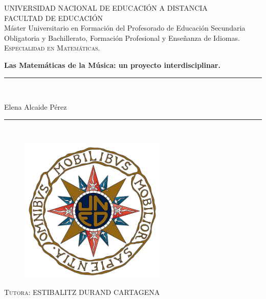 \documentclass[a4paper, openright, 11pt, titlepage]{report}
\theoremstyle{definition}\newtheorem{defin}[propo]{Definition}
\theoremstyle{definition}\newtheorem{obser}[propo]{Remark}
\theoremstyle{definition}\newtheorem{ejem}[propo]{Ejemplo}
\theoremstyle{definition}\newtheorem{algoritmo}[propo]{Algoritmo}
\begin{document}
\begin{titlepage}

\begin{center}
UNIVERSIDAD NACIONAL DE EDUCACIÓN A DISTANCIA\\
\vspace*{0.15in}
FACULTAD DE EDUCACIÓN\\
\vspace*{0.2in}
Máster Universitario en Formación del Profesorado 
de Educación Secundaria Obligatoria y Bachillerato, Formación Profesional y Enseñanza de Idiomas.\\
\textsc{Especialidad en Matemáticas.}\\
\vspace*{0.4cm}
\begin{LARGE}
\textbf{Las Matemáticas de la Música: un proyecto interdisciplinar.}\\
\end{LARGE}
\vspace*{0.3in}
\rule{80mm}{0.1mm}\\
\vspace*{0.1in}
\begin{LARGE}
Elena Alcaide Pérez\\
\end{LARGE}
\vspace*{0.2in}
\rule{80mm}{0.1mm}\\
\begin{figure}[H]
 \centering
 \includegraphics[width=7cm]{Images/escudo.png}
\end{figure}
\vspace*{0.2in}
\vspace*{0.1in}


\large{\textsc{Tutora: ESTIBALITZ DURAND CARTAGENA}}\\

\vspace*{0.3in}
\end{center}
\end{titlepage}
\newpage
{}
$\ $
\thispagestyle{empty} %
\end{document}
